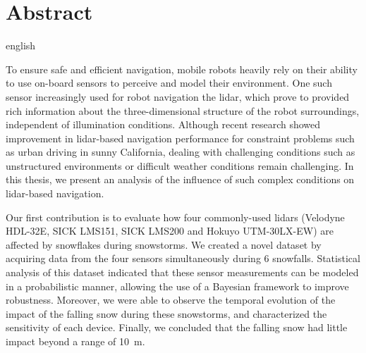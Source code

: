 \chapter*{Abstract}  

\begin{otherlanguage*}{english}

    To ensure safe and efficient navigation, mobile robots heavily rely on their ability to use on-board sensors to perceive and model their environment. One such sensor increasingly used for robot navigation the \gls*{lidar}, which prove to provided rich information about the three-dimensional structure of the robot surroundings, independent of illumination conditions. Although recent research showed improvement in \gls*{lidar}-based navigation performance for constraint problems such as urban driving in sunny California, dealing with challenging conditions such as unstructured environments or difficult weather conditions remain challenging. In this thesis, we present an analysis of the influence of such complex conditions on \gls*{lidar}-based navigation.

    Our first contribution is to evaluate how four commonly-used \gls*{lidar}s (Velodyne HDL-32E, SICK LMS151, SICK LMS200 and Hokuyo UTM-30LX-EW) are affected by snowflakes during snowstorms. We created a novel dataset by acquiring data from the four sensors simultaneously during 6 snowfalls. Statistical analysis of this dataset indicated that these sensor measurements can be modeled in a probabilistic manner, allowing the use of a Bayesian framework to improve robustness. Moreover, we were able to observe the temporal evolution of the impact of the falling snow during these snowstorms, and characterized the sensitivity of each device. Finally, we concluded that the falling snow had little impact beyond a range of \SI{10}{\meter}.


\end{otherlanguage*}
